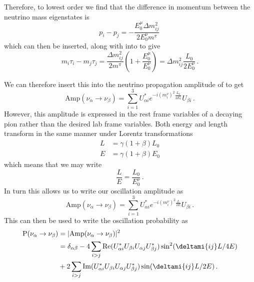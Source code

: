 Therefore, to lowest order we find that the difference in momentum between the neutrino mass eigenstates is
\begin{equation}
  p_{i} - p_{j} = -\frac{ E^{\mu}_{0} \Delta m_{ij}^{2} }{ 2E^{\nu}_{0}m^{\pi} } \, 
\end{equation}
which can then be inserted, along with  into  to give
\begin{equation}
  m_{i}\tau_{i} - m_{j}\tau_{j} = \frac{ \Delta m_{ij}^{2} }{ 2m^{\pi} }\left(1 + \frac{ E_{0}^{\mu} }{ E_{0}^{\nu} } \right) = \Delta m_{ij}^{2} \frac{L_{0}}{2E_{0}^{\nu}} \, .
\end{equation}

We can therefore insert this into the neutrino propagation amplitude of  to get
\begin{equation}
  \text{Amp}(\nu_{\alpha} \rightarrow \nu_{\beta}) = \sum_{i=1}^{3} U_{\alpha i}^{*} e^{ -i(m_{i}^{\nu})^{2}\frac{L_{0}}{2E^{\nu}_{0}} } U_{\beta i} \, .
\end{equation}
However, this amplitude is expressed in the rest frame variables of a decaying pion rather than the desired lab frame variables.
Both energy and length transform in the same manner under Lorentz transformations
\begin{align}
  L &= \gamma (1 + \beta) L_{0} \\
  E &= \gamma (1 + \beta) E_{0}
\end{align}
which means that we may write
\begin{equation}
\frac{L}{E} = \frac{L_{0}}{E_{0}^{\nu}} \, .
\end{equation}
In turn this allows us to write our oscillation amplitude as
\begin{equation}
  \text{Amp}(\nu_{\alpha} \rightarrow \nu_{\beta}) = \sum_{i=1}^{3} U_{\alpha i}^{*} e^{ -i(m_{i}^{\nu})^{2}\frac{L}{2E} } U_{\beta i} \, .
\end{equation}
This can then be used to write the oscillation probability as
\begin{align}
  \text{P}(\nu_{\alpha} \rightarrow \nu_{\beta}) &= | \text{Amp}(\nu_{\alpha} \rightarrow \nu_{\beta}) |^{2} \nonumber \\
  &= \delta_{\alpha \beta} - 4 \sum_{i > j} \text{Re}( U^{*}_{\alpha i} U_{\beta i} U_{\alpha j} U^{*}_{\beta j} ) \sin^{2}(\deltami{ij}L/4E) \nonumber \\
  & + 2 \sum_{i>j} \text{Im}( U^{*}_{\alpha i} U_{\beta i} U_{\alpha j} U^{*}_{\beta j} ) \sin (\deltami{ij}L/2E) \, .
  \label{eq:oscProbAllOut}
\end{align}

